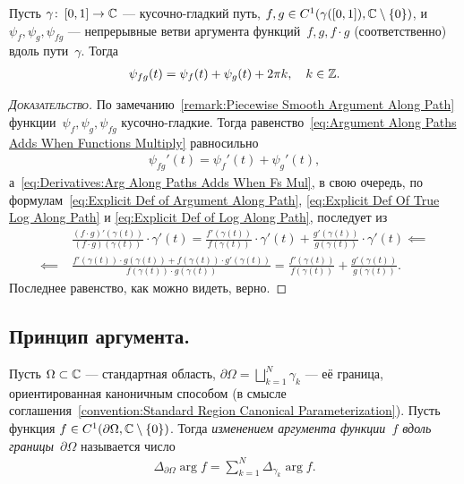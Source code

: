 \documentclass[../complex-analysis.tex]{subfiles}
\begin{document}
\begin{remrk}
 \label{remark:Argument Along Paths Adds When Functions Multiply}
 Пусть $ \gamma\colon\,[0,1] \to \mathbb{C} $ --- кусочно-гладкий путь, $ f,g\in C^{1}(\gamma([0,1]), \mathbb{C} \setminus \left\{ 0 \right\}) $, и $ \psi_f, \psi_g, \psi_{fg} $ --- непрерывные ветви аргумента функций~$ f, g, f \cdot g $ (соответственно) вдоль пути~$ \gamma $. Тогда
 \begin{align}
  \label{eq:Argument Along Paths Adds When Functions Multiply}
  \psi_{fg}(t) = \psi_f(t) + \psi_g(t) + 2\pi k, \quad k \in \mathbb{Z}.
 \end{align}
\end{remrk}
\begin{proof}[\normalfont\textsc{Доказательство}]
 По замечанию~\ref{remark:Piecewise Smooth Argument Along Path} функции~$ \psi_f, \psi_g, \psi_{fg} $ кусочно-гладкие. Тогда равенство~\eqref{eq:Argument Along Paths Adds When Functions Multiply} равносильно
 \begin{align}
  \label{eq:Derivatives:Arg Along Paths Adds When Fs Mul}
  \psi_{fg}'(t) = \psi_f'(t) + \psi_g'(t),
 \end{align} а~\eqref{eq:Derivatives:Arg Along Paths Adds When Fs Mul}, в свою очередь, по формулам~\eqref{eq:Explicit Def of Argument Along Path}, \eqref{eq:Explicit Def Of True Log Along Path} и \eqref{eq:Explicit Def of Log Along Path}, последует из
 \begin{align*}
  &\frac{(f \cdot g)'(\gamma(t))}{(f \cdot g)(\gamma(t))} \cdot \gamma'(t) = \frac{f'(\gamma(t))}{f(\gamma(t))} \cdot \gamma'(t) + \frac{g'(\gamma(t))}{g(\gamma(t))} \cdot \gamma'(t) \impliedby \\
  \impliedby\;& \frac{f'(\gamma(t)) \cdot g(\gamma(t)) + f(\gamma(t)) \cdot g'(\gamma(t))}{f(\gamma(t)) \cdot g(\gamma(t))} = \frac{f'(\gamma(t))}{f(\gamma(t))} + \frac{g'(\gamma(t))}{g(\gamma(t))}.
 \end{align*} Последнее равенство, как можно видеть, верно.
\end{proof}

\subsection{Принцип аргумента.}

\begin{notatn}
 Пусть $ \Omega \subset \mathbb{C} $ --- стандартная область, $ \partial \Omega  = \bigsqcup_{k=1}^{N} \gamma_k $  --- её граница, ориентированная каноничным способом (в смысле соглашения~\ref{convention:Standard Region Canonical Parameterization}). Пусть функция $ f \in C^{1}(\partial\Omega, \mathbb{C} \setminus \left\{ 0 \right\}) $. Тогда \emph{изменением аргумента функции~$ f $ вдоль границы~$ \partial\Omega $} называется число
 \begin{align*}
  \Delta_{\partial \Omega} \arg f = \sum_{k=1}^{N}\Delta_{\gamma_k} \arg f.
 \end{align*}
\end{notatn}
\end{document}
